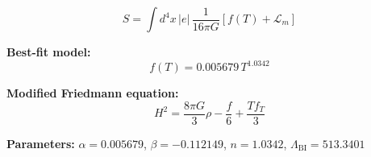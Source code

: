 
\begin{equation}
  S = \int d^4x \, |e| \, \frac{1}{16\pi G} \left[ f(T) + \mathcal{L}_m \right]
\end{equation}

\textbf{Best-fit model:}
\begin{equation}
  f(T) = 0.005679 \, T^{1.0342}
\end{equation}

\textbf{Modified Friedmann equation:}
\begin{equation}
  H^2 = \frac{8\pi G}{3} \rho - \frac{f}{6} + \frac{T f_T}{3}
\end{equation}

\textbf{Parameters:}
$\alpha = 0.005679$, \quad
$\beta = -0.112149$, \quad
$n = 1.0342$, \quad
$\Lambda_{\text{BI}} = 513.3401$